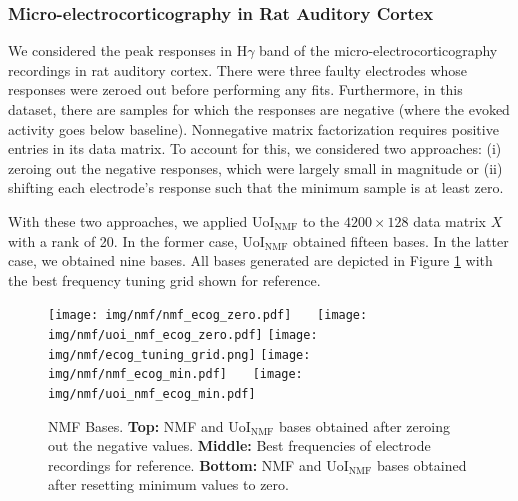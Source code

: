 \documentclass[11pt]{article}
\begin{document}
\subsubsection{Micro-electrocorticography in Rat Auditory Cortex}
We considered the peak responses in H$\gamma$ band of the micro-electrocorticography recordings in rat auditory cortex. There were three faulty electrodes whose responses were zeroed out before performing any fits. Furthermore, in this dataset, there are samples for which the responses are negative (where the evoked activity goes below baseline). Nonnegative matrix factorization requires positive entries in its data matrix. To account for this, we considered two approaches: (i) zeroing out the negative responses, which were largely small in magnitude or (ii) shifting each electrode's response such that the minimum sample is at least zero. 

With these two approaches, we applied UoI$_{\text{NMF}}$ to the $4200\times 128$ data matrix $X$ with a rank of 20. In the former case, UoI$_{\text{NMF}}$ obtained fifteen bases. In the latter case, we obtained nine bases. All bases generated are depicted in Figure \ref{fig:nmf_ecog_bases} with the best frequency tuning grid shown for reference.

\begin{figure}[t]
	\centering
	\texttt{[image: img/nmf/nmf\_ecog\_zero.pdf]}
	\ \ \ 
	\texttt{[image: img/nmf/uoi\_nmf\_ecog\_zero.pdf]}
	\texttt{[image: img/nmf/ecog\_tuning\_grid.png]}
	\texttt{[image: img/nmf/nmf\_ecog\_min.pdf]}
	\ \ \ 
	\texttt{[image: img/nmf/uoi\_nmf\_ecog\_min.pdf]}
	\caption{NMF Bases. \textbf{Top:} NMF and UoI$_{\text{NMF}}$ bases obtained after zeroing out the negative values. \textbf{Middle:} Best frequencies of electrode recordings for reference. \textbf{Bottom:} NMF and UoI$_{\text{NMF}}$ bases obtained after resetting minimum values to zero.}
	\label{fig:nmf_ecog_bases}
\end{figure}
\end{document}
